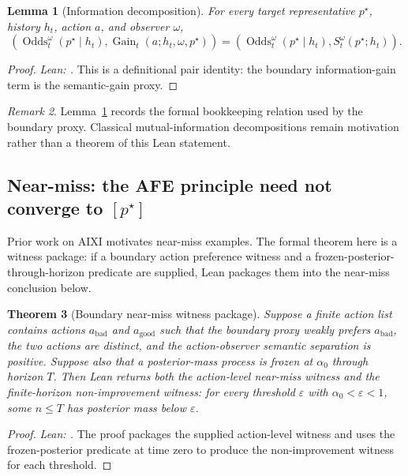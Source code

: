 \documentclass[11pt]{article}
\newtheorem{theorem}{Theorem}[section]
\newtheorem{lemma}[theorem]{Lemma}
\theoremstyle{definition}
\theoremstyle{remark}
\newtheorem{remark}[theorem]{Remark}
\theoremstyle{plain}
\theoremstyle{definition}
\begin{document}
\begin{lemma}[Information decomposition]
\label{lem:info-decomp}
For every target representative $p^\star$, history $h_t$, action $a$, and observer $\omega$,
\[
\left(
\operatorname{Odds}_t^\omega(p^\star\mid h_t),
\operatorname{Gain}_t(a;h_t,\omega,p^\star)
\right)
=
\left(
\operatorname{Odds}_t^\omega(p^\star\mid h_t),
S_t^\omega(p^\star;h_t)
\right).
\]
\end{lemma}

\begin{proof}
\noindent\emph{Lean: .}
This is a definitional pair identity: the boundary information-gain term is the semantic-gain proxy.
\end{proof}

\begin{remark}
Lemma~\ref{lem:info-decomp} records the formal bookkeeping relation used by the boundary proxy. Classical mutual-information decompositions remain motivation rather than a theorem of this Lean statement.
\end{remark}

\subsection{Near-miss: the AFE principle need not converge to $[p^\star]$}

Prior work on AIXI motivates near-miss examples. The formal theorem here is a witness package: if a boundary action preference witness and a frozen-posterior-through-horizon predicate are supplied, Lean packages them into the near-miss conclusion below.

\begin{theorem}[Boundary near-miss witness package]
\label{thm:afe-near-miss}
Suppose a finite action list contains actions $a_{\mathrm{bad}}$ and $a_{\mathrm{good}}$ such that the boundary proxy weakly prefers $a_{\mathrm{bad}}$, the two actions are distinct, and the action-observer semantic separation is positive. Suppose also that a posterior-mass process is frozen at $\alpha_0$ through horizon $T$. Then Lean returns both the action-level near-miss witness and the finite-horizon non-improvement witness: for every threshold $\varepsilon$ with $\alpha_0<\varepsilon<1$, some $n\le T$ has posterior mass below $\varepsilon$.
\end{theorem}

\begin{proof}
\noindent\emph{Lean: .}
The proof packages the supplied action-level witness and uses the frozen-posterior predicate at time zero to produce the non-improvement witness for each threshold.
\end{proof}
\end{document}
